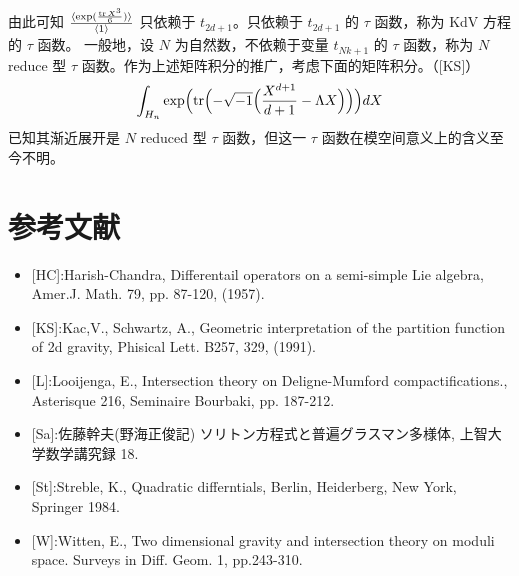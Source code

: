 \begin{remark}
由此可知 $\frac{\langle\exp(\frac{\operatorname{tr} X^3}{6})\rangle}{\langle1\rangle}$ 只依赖于 $t_{2d+1}$。只依赖于 $t_{2d+1}$ 的 $\tau$ 函数，称为 KdV 方程的 $\tau$ 函数。
一般地，设 $N$ 为自然数，不依赖于变量 $t_{Nk+1}$ 的 $\tau$ 函数，称为 $N$ reduce 型 $\tau$ 函数。作为上述矩阵积分的推广，考虑下面的矩阵积分。（[KS]）
\[
\int_{H_n}\exp\Bigl(\operatorname{tr}\Bigl(-\sqrt{-1}\Bigl(\frac{X^{d+1}}{d+1}-\Lambda X\Bigr)\Bigr)\Bigr)dX
\]
已知其渐近展开是 $N$ reduced 型 $\tau$ 函数，但这一 $\tau$ 函数在模空间意义上的含义至今不明。
\end{remark}


\section*{参考文献}
\begin{itemize}[leftmargin=2em,itemsep=3pt,topsep=4pt,label={}]
\item {}[HC]:Harish-Chandra, Differentail operators on a semi-simple Lie algebra, Amer.J. Math. 79, pp. 87-120, (1957).
\item {}[KS]:Kac,V., Schwartz, A., Geometric interpretation of the partition function of 2d gravity, Phisical Lett. B257, 329, (1991).
\item {}[L]:Looijenga, E., Intersection theory on Deligne-Mumford compactifications., Asterisque 216, Seminaire Bourbaki, pp. 187-212.
\item {}[Sa]:佐藤幹夫(野海正俊記) ソリトン方程式と普遍グラスマン多様体, 上智大学数学講究録 18.
\item {}[St]:Streble, K., Quadratic differntials, Berlin, Heiderberg, New York, Springer 1984.
\item {}[W]:Witten, E., Two dimensional gravity and intersection theory on moduli space. Surveys in Diff. Geom. 1, pp.243-310.
\end{itemize}

